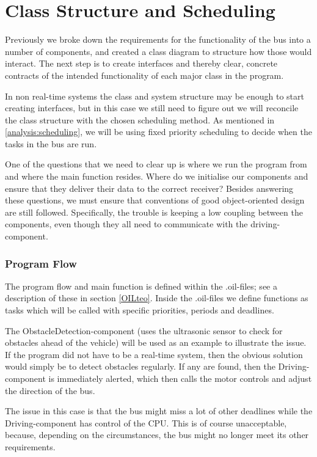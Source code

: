 \section{Class Structure and Scheduling}

Previously we broke down the requirements for the functionality of the bus into a number of components, and created a class diagram  to structure how those would interact. The next step is to create interfaces and thereby clear, concrete contracts of the intended functionality of each major class in the program. 

In non real-time systems the class and system structure may be enough to start creating interfaces, but in this case we still need to figure out we will reconcile the class structure with the chosen scheduling method. As mentioned in \ref{analysis:scheduling}, we will be using fixed priority scheduling to decide when the tasks in the bus are run. 

One of the questions that we need to clear up is where we run the program from and where the main function resides. Where do we initialise our components and ensure that they deliver their data to the correct receiver? Besides answering these questions, we must ensure that conventions of good object-oriented design are still followed. Specifically, the trouble is keeping a low coupling between the components, even though they all need to communicate with the driving-component. 

\subsubsection{Program Flow}
The program flow and main function is defined within the .oil-files; see a description of these in section \ref{OILteo}. Inside the .oil-files we define functions as tasks which will be called with specific priorities, periods and deadlines. 

The ObstacleDetection-component (uses the ultrasonic sensor to check for obstacles ahead of the vehicle) will be used as an example to illustrate the issue. If the program did not have to be a real-time system, then the obvious solution would simply be to detect obstacles regularly. If any are found, then the Driving-component is immediately alerted, which then calls the motor controls and adjust the direction of the bus.

The issue in this case is that the bus might miss a lot of other deadlines while the Driving-component has control of the CPU. This is of course unacceptable, because, depending on the circumstances, the bus might no longer meet its other requirements. 

